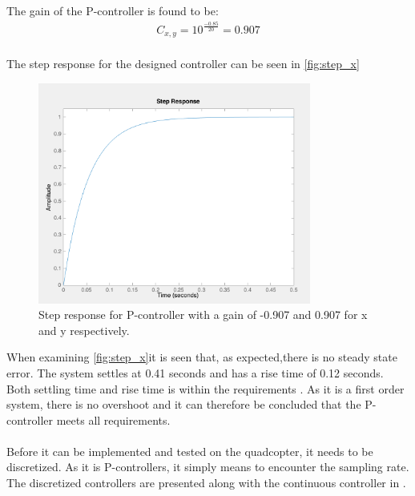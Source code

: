 The gain of the P-controller is found to be: 
\begin{align}
C_{x,y}=10^{\frac{-0.85}{20}}=0.907\\
\end{align}

The step response for the designed controller can be seen in \autoref{fig:step_x}
\begin{figure}[H]
	\centering
	\includegraphics[width=0.8\textwidth]{figures/step_x.png}
	\caption{Step response for P-controller with a gain of -0.907 and 0.907 for x and y respectively.}\label{fig:step_x}
\end{figure}
When examining \autoref{fig:step_x}it is seen that, as expected,there is no steady state error. The system settles at 0.41 seconds and has a rise time of 0.12 seconds. Both settling time and rise time is within the requirements . As it is a first order system, there is no overshoot and it can therefore be concluded that the P-controller meets all requirements.
\\
\\
Before it can be implemented and tested on the quadcopter, it needs to be discretized. As it is P-controllers, it simply means to encounter the sampling rate. The discretized controllers are presented along with the continuous controller in .
\\ \\
  

